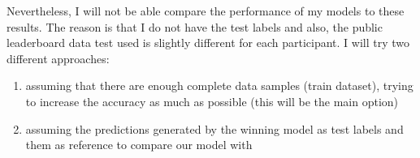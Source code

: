\documentclass[]{article}
\begin{document}
Nevertheless, I will not be able compare the performance of my models to these results. The reason is that I do not have the test labels and also, the public leaderboard data test used is slightly different for each participant. I will try two different approaches:
\begin{enumerate}
	\item assuming that there are enough complete data samples (train dataset), trying to increase the accuracy as much as possible (this will be the main option)
	\item assuming the predictions generated by the winning model as test labels and them as reference to compare our model with
\end{enumerate}

\pagebreak



\end{document}
